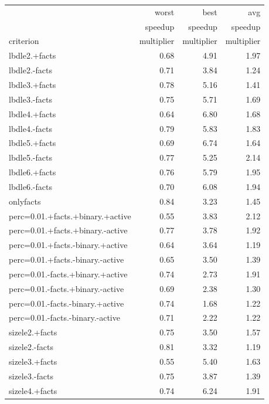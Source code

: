 \begin{table}
	\small
	\begin{tabular}{lrrr}
		\toprule
					&	worst 		&	best		&	avg \\
					&	 \phantom{(x)} speedup		&	\phantom{(x)} speedup		&	\phantom{(x)} speedup \\
		criterion	&	multiplier	&	multiplier	&	multiplier \\
		\cmidrule(r){1-4}
		lbdle2.+facts	&	0.68	&	4.91	&	1.97 \\
		lbdle2.-facts	&	0.71	&	3.84	&	1.24 \\
		lbdle3.+facts	&	0.78	&	5.16	&	1.41 \\
		lbdle3.-facts	&	0.75	&	5.71	&	1.69 \\
		lbdle4.+facts	&	0.64	&	6.80	&	1.68 \\
		lbdle4.-facts	&	0.79	&	5.83	&	1.83 \\
		lbdle5.+facts	&	0.69	&	6.74	&	1.64 \\
		lbdle5.-facts	&	0.77	&	5.25	&	2.14 \\
		lbdle6.+facts	&	0.76	&	5.79	&	1.95 \\
		lbdle6.-facts	&	0.70	&	6.08	&	1.94 \\
		\cmidrule(r){1-4}
		onlyfacts	&	\cellcolor{green}0.84	&	3.23	&	1.45 \\
		\cmidrule(r){1-4}
		perc=0.01.+facts.+binary.+active	&	\cellcolor{red}0.55	&	3.83	&	2.12 \\
		perc=0.01.+facts.+binary.-active	&	0.77	&	3.78	&	1.92 \\
		perc=0.01.+facts.-binary.+active	&	0.64	&	3.64	&	\cellcolor{red}1.19 \\
		perc=0.01.+facts.-binary.-active	&	0.65	&	3.50	&	1.39 \\
		perc=0.01.-facts.+binary.+active	&	0.74	&	2.73	&	1.91 \\
		perc=0.01.-facts.+binary.-active	&	0.69	&	2.38	&	1.30 \\
		perc=0.01.-facts.-binary.+active	&	0.74	&	\cellcolor{red}1.68	&	1.22 \\
		perc=0.01.-facts.-binary.-active	&	0.71	&	2.22	&	1.22 \\
		\cmidrule(r){1-4}
		sizele2.+facts	&	0.75	&	3.50	&	1.57 \\
		sizele2.-facts	&	0.81	&	3.32	&	\cellcolor{red}1.19 \\
		sizele3.+facts	&	\cellcolor{red}0.55	&	5.40	&	1.63 \\
		sizele3.-facts	&	0.75	&	3.87	&	1.39 \\
		sizele4.+facts	&	0.74	&	6.24	&	1.91 \\

\end{tabular}
\end{table}
